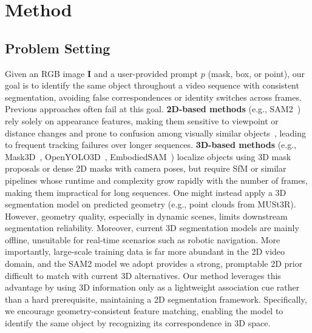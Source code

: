 \vspace{-1em}
\section{Method}
\label{sec:method}
\vspace{-0.5em}



\subsection{Problem Setting}
\vspace{-0.5em}
Given an RGB image $\mathbf{I}$ and a user-provided prompt $p$ (mask, box, or point), our goal is to identify the same object throughout a video sequence with consistent segmentation, avoiding false correspondences or identity switches across frames.
Previous approaches often fail at this goal.
\textbf{2D-based methods} (e.g., SAM2~\cite{ravi2024sam2}) rely solely on appearance features, making them sensitive to viewpoint or distance changes and prone to confusion among visually similar objects~\cite{videnovic2025distractor}, leading to frequent tracking failures over longer sequences.
\textbf{3D-based methods} (e.g., Mask3D~\cite{schult2022mask3d}, OpenYOLO3D~\cite{boudjoghra2024open}, EmbodiedSAM~\cite{xu2024esam}) localize objects using 3D mask proposals or dense 2D masks with camera poses, but require SfM or similar pipelines whose runtime and complexity grow rapidly with the number of frames, making them impractical for long sequences.
One might instead apply a 3D segmentation model on predicted geometry (e.g., point clouds from MUSt3R). However, geometry quality, especially in dynamic scenes, limits downstream segmentation reliability. Moreover, current 3D segmentation models are mainly offline, unsuitable for real-time scenarios such as robotic navigation. More importantly, large-scale training data is far more abundant in the 2D video domain, and the SAM2 model we adopt provides a strong, promptable 2D prior difficult to match with current 3D alternatives. Our method leverages this advantage by using 3D information only as a lightweight association cue rather than a hard prerequisite, maintaining a 2D segmentation framework. Specifically, we encourage geometry-consistent feature matching, enabling the model to identify the same object by recognizing its correspondence in 3D space.
